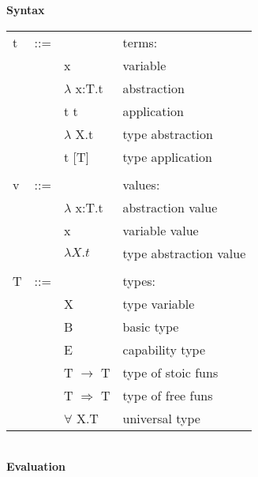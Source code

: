 \begin{figure}
\begin{framed}

\setlength{\columnseprule}{0.4pt}
\begin{multicols}{2}

\textbf{Syntax}

\begin{tabu} to \linewidth {l l l X[r]}
  t   & ::= &                                      & terms:               \\
      &     &  x                                   & variable             \\
      &     & $\lambda$ x:T.t                      & abstraction          \\
      &     & t t                                  & application          \\
      &     & $\lambda$ X.t                        & type abstraction     \\
      &     & t [T]                                & type application     \\
\\
  v   & ::= &                    & values:              \\
      &     & $\lambda$ x:T.t    & abstraction value    \\
      &     & x                  & variable value       \\
      &     & $\lambda X.t$      & type abstraction value  \\
\\
  T   & ::= &                       & types:               \\
      &     & X                     & type variable        \\
      &     & B                     & basic type           \\
      &     & E                     & capability type      \\
      &     & T $\to$ T             & type of stoic funs   \\
      &     & \colorbox{shade}{T $\Rightarrow$ T}     & type of free funs    \\
      &     & $\forall$ X.T         & universal type       \\
\end{tabu}

\hfill\\

\textbf{Evaluation} \hfill {}


\end{multicols}
\end{framed}
\end{figure}
